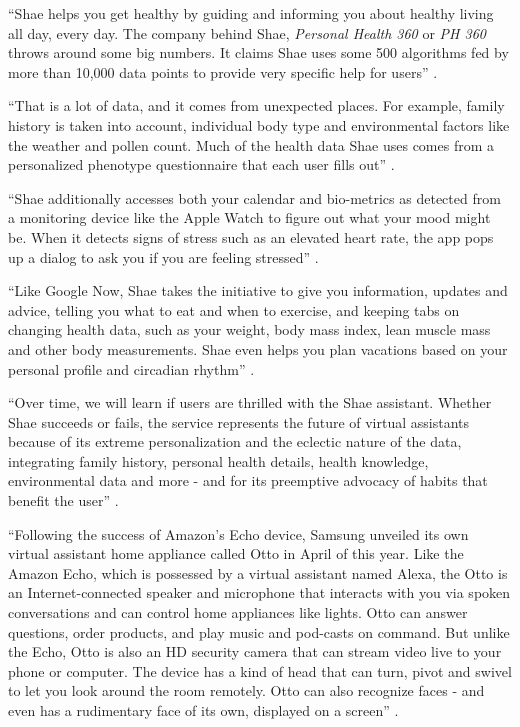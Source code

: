 ``Shae helps you get healthy by guiding and informing you about healthy living all day, every day. The company behind Shae, {\em Personal Health 360} or {\em PH 360} throws around some big numbers. It claims Shae uses some 500 algorithms fed by more than 10,000 data points to provide very specific help for users'' \cite{Elgan2016future}.

``That is a lot of data, and it comes from unexpected places. For example, family history is taken into account, individual body type and environmental factors like the weather and pollen count. Much of the health data Shae uses comes from a personalized phenotype questionnaire that each user fills out'' \cite{Elgan2016future}.

``Shae additionally accesses both your calendar and bio-metrics as detected from a monitoring device like the Apple Watch to figure out what your mood might be. When it detects signs of stress such as an elevated heart rate, the app pops up a dialog to ask you if you are feeling stressed'' \cite{Elgan2016future}.

``Like Google Now, Shae takes the initiative to give you information, updates and advice, telling you what to eat and when to exercise, and keeping tabs on changing health data, such as your weight, body mass index, lean muscle mass and other body measurements. Shae even helps you plan vacations based on your personal profile and circadian rhythm'' \cite{Elgan2016future}.

``Over time, we will learn if users are thrilled with the Shae assistant. Whether Shae succeeds or fails, the service represents the future of virtual assistants because of its extreme personalization and the eclectic nature of the data, integrating family history, personal health details, health knowledge, environmental data and more - and for its preemptive advocacy of habits that benefit the user'' \cite{Elgan2016future}.

``Following the success of Amazon's Echo device, Samsung unveiled its own virtual assistant home appliance called Otto in April of this year. Like the Amazon Echo, which is possessed by a virtual assistant named Alexa, the Otto is an Internet-connected speaker and microphone that interacts with you via spoken conversations and can control home appliances like lights. Otto can answer questions, order products, and play music and pod-casts on command. But unlike the Echo, Otto is also an HD security camera that can stream video live to your phone or computer. The device has a kind of head that can turn, pivot and swivel to let you look around the room remotely. Otto can also recognize faces - and even has a rudimentary face of its own, displayed on a screen'' \cite{Elgan2016future}.


